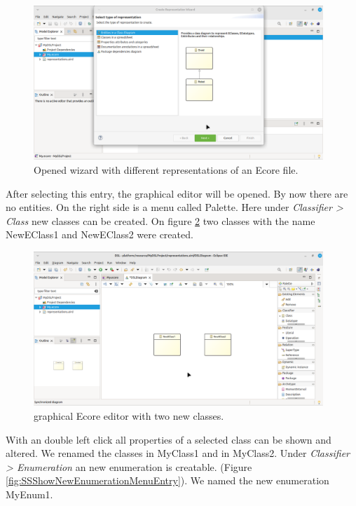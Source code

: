 \documentclass[a4paper,10pt]{article}
\newcommand{\gerquot}[1]{\glqq#1\grqq}
\newcommand{\ScreenshotWidth}{0.975}
\begin{document}
\begin{figure}[H]
\centering
\includegraphics[width=\ScreenshotWidth\textwidth]{./Screenshots/SS_8.png}
\caption{Opened wizard with different representations of an Ecore file.}
\label{fig:SSWizardEcoreRepresentations}
\end{figure}

After selecting this entry, the graphical editor will be opened. By now there are no entities. On the right side is a menu called \gerquot{Palette}. Here under \emph{Classifier > Class} new classes can be created. On figure \ref{fig:SSGraphicalEcoreEditorWithTwoNewClasses} two classes with the name \gerquot{NewEClass1} and \gerquot{NewEClass2} were created.

\begin{figure}[H]
\centering
\includegraphics[width=\ScreenshotWidth\textwidth]{./Screenshots/SS_10.png}
\caption{graphical Ecore editor with two new classes.}
\label{fig:SSGraphicalEcoreEditorWithTwoNewClasses}
\end{figure}

With an double left click all properties of a selected class can be shown and altered. We renamed the classes in \gerquot{MyClass1} and in \gerquot{MyClass2}. Under \emph{Classifier > Enumeration} an new enumeration is creatable. (Figure \ref{fig:SSShowNewEnumerationMenuEntry}). We named the new enumeration \gerquot{MyEnum1}.
\end{document}
